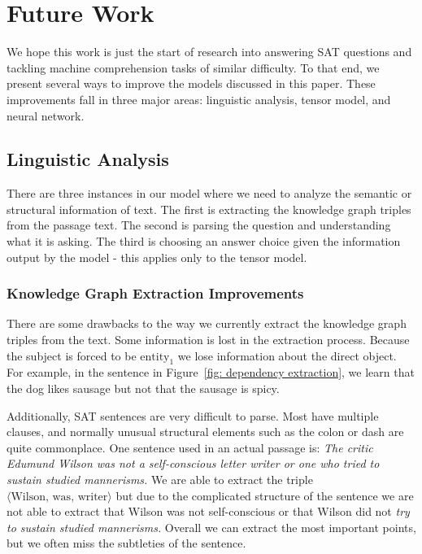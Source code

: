 \documentclass[pageno]{final_paper}
\begin{document}
\section{Future Work}
\label{Future Work}

We hope this work is just the start of research into answering SAT questions and
tackling machine comprehension tasks of similar difficulty. To that end, we
present several ways to improve the models discussed in this paper. These
improvements fall in three major areas: linguistic analysis, tensor model, and
neural network.

\subsection{Linguistic Analysis}
\label{Linguistic Analysis}

There are three instances in our model where we need to analyze the semantic or
structural information of text. The first is extracting the knowledge graph
triples from the passage text. The second is parsing the question and
understanding what it is asking. The third is choosing an answer choice given
the information output by the model - this applies only to the tensor model.

\subsubsection{Knowledge Graph Extraction Improvements}
\label{Knowledge Graph Extraction Improvements}

There are some drawbacks to the way we currently extract the knowledge graph
triples from the text. Some information is lost in the extraction process.
Because the subject is forced to be $\text{entity}_1$ we lose information about
the direct object. For example, in the sentence in Figure~\ref{fig: dependency
extraction}, we learn that the dog likes sausage but not that the sausage is
spicy.

Additionally, SAT sentences are very difficult to parse. Most have multiple
clauses, and normally unusual structural elements such as the colon or dash are
quite commonplace. One sentence used in an actual passage is: \textit{The critic
Edumund Wilson was not a self-conscious letter writer or one who tried to
sustain studied mannerisms.} We are able to extract the triple $\langle
\text{Wilson}, \,\text{was}, \,\text{writer} \rangle$ but due to the complicated
structure of the sentence we are not able to extract that Wilson was not
self-conscious or that Wilson did not \textit{try to sustain studied
mannerisms.} Overall we can extract the most important points, but we often miss
the subtleties of the sentence.
\end{document}
